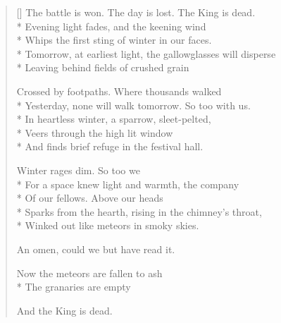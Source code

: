 \label{ch:lear_bo}
\settowidth{\versewidth}{Tomorrow, at earliest light, the gallowglasses will disperse}
\begin{verse}[\versewidth]
The battle is won. The day is lost. The King is dead.\\*
Evening light fades, and the keening wind\\*
Whips the first sting of winter in our faces.\\*
Tomorrow, at earliest light, the gallowglasses will disperse\\*
Leaving behind fields of crushed grain

Crossed by footpaths.  Where thousands walked\\*
Yesterday, none will walk tomorrow.  So too with us.\\*
In heartless winter, a sparrow, sleet-pelted,\\*
Veers through the high lit window\\*
And finds brief refuge in the festival hall.

Winter rages dim.  So too we\\*
For a space knew light and warmth, the company\\*
Of our fellows.  Above our heads\\*
Sparks from the hearth, rising in the chimney's throat,\\*
Winked out like meteors in smoky skies.

An omen, could we but have read it.

Now the meteors are fallen to ash\\*
The granaries are empty

And the King is dead.
\end{verse}
